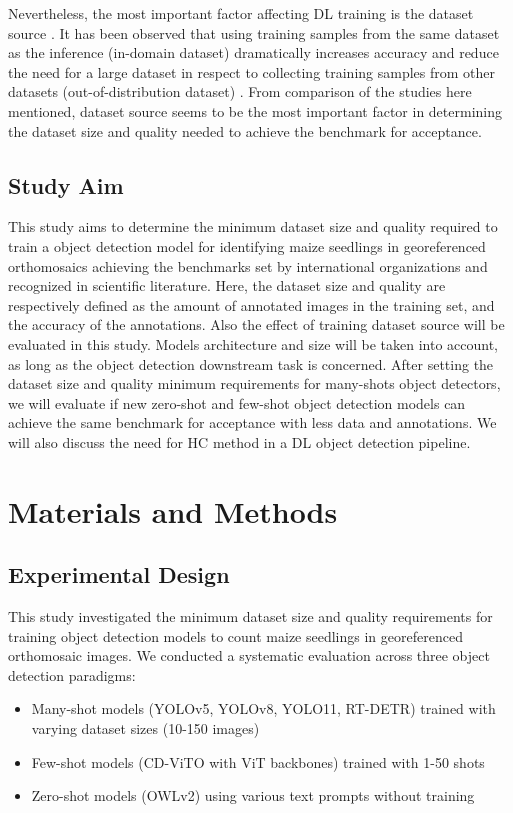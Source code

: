 \documentclass{article}
\begin{document}
Nevertheless, the most important factor affecting DL training is the dataset source 
\cite{sunRevisitingUnreasonableEffectiveness2017}. 
It has been observed that using training samples from the same
dataset as the inference (in-domain dataset) dramatically increases accuracy and reduce the need 
for a large dataset in respect to collecting training samples from other 
datasets (out-of-distribution dataset) \cite{davidPlantDetectionCounting2021,andvaagCountingCanolaGeneralizable2024}. 
From comparison of the studies here mentioned, dataset source seems to be the most 
important factor in determining the dataset size and quality needed to achieve the benchmark 
for acceptance.

\subsection*{Study Aim}

This study aims to determine the minimum dataset size and quality required to train 
a object detection model for identifying maize seedlings in georeferenced orthomosaics
achieving the benchmarks set by international organizations and recognized in scientific literature.
Here, the dataset size and quality are respectively defined as the amount of annotated 
images in the training set, and the accuracy of the annotations.
Also the effect of training dataset source will be evaluated in this study.
Models architecture and size will be taken into account, as long as the object detection
downstream task is concerned. 
After setting the dataset size and quality minimum requirements for many-shots
object detectors, we will evaluate if new zero-shot and few-shot object detection
models can achieve the same benchmark for acceptance with less data and annotations.
We will also discuss the need for HC method in a DL object detection pipeline.

\section{Materials and Methods}

\subsection{Experimental Design}
This study investigated the minimum dataset size and quality requirements for training object detection models to count maize seedlings in georeferenced orthomosaic images. We conducted a systematic evaluation across three object detection paradigms:
\begin{itemize}
    \item Many-shot models (YOLOv5, YOLOv8, YOLO11, RT-DETR) trained with varying dataset sizes (10-150 images)
    \item Few-shot models (CD-ViTO with ViT backbones) trained with 1-50 shots
    \item Zero-shot models (OWLv2) using various text prompts without training
\end{itemize}
\end{document}
